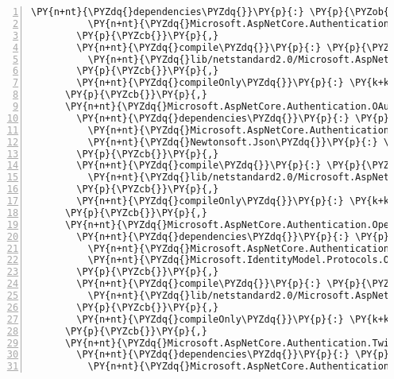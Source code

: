 \begin{Verbatim}[commandchars=\\\{\},numbers=left,firstnumber=1,stepnumber=1,numberblanklines=0]
        \PY{n+nt}{\PYZdq{}dependencies\PYZdq{}}\PY{p}{:} \PY{p}{\PYZob{}}
          \PY{n+nt}{\PYZdq{}Microsoft.AspNetCore.Authentication.OAuth\PYZdq{}}\PY{p}{:} \PY{l+s+s2}{\PYZdq{}2.1.0\PYZhy{}rc1\PYZhy{}final\PYZdq{}}
        \PY{p}{\PYZcb{}}\PY{p}{,}
        \PY{n+nt}{\PYZdq{}compile\PYZdq{}}\PY{p}{:} \PY{p}{\PYZob{}}
          \PY{n+nt}{\PYZdq{}lib/netstandard2.0/Microsoft.AspNetCore.Authentication.MicrosoftAccount.dll\PYZdq{}}\PY{p}{:} \PY{p}{\PYZob{}}\PY{p}{\PYZcb{}}
        \PY{p}{\PYZcb{}}\PY{p}{,}
        \PY{n+nt}{\PYZdq{}compileOnly\PYZdq{}}\PY{p}{:} \PY{k+kc}{true}
      \PY{p}{\PYZcb{}}\PY{p}{,}
      \PY{n+nt}{\PYZdq{}Microsoft.AspNetCore.Authentication.OAuth/2.1.0\PYZhy{}rc1\PYZhy{}final\PYZdq{}}\PY{p}{:} \PY{p}{\PYZob{}}
        \PY{n+nt}{\PYZdq{}dependencies\PYZdq{}}\PY{p}{:} \PY{p}{\PYZob{}}
          \PY{n+nt}{\PYZdq{}Microsoft.AspNetCore.Authentication\PYZdq{}}\PY{p}{:} \PY{l+s+s2}{\PYZdq{}2.1.0\PYZhy{}rc1\PYZhy{}final\PYZdq{}}\PY{p}{,}
          \PY{n+nt}{\PYZdq{}Newtonsoft.Json\PYZdq{}}\PY{p}{:} \PY{l+s+s2}{\PYZdq{}11.0.2\PYZdq{}}
        \PY{p}{\PYZcb{}}\PY{p}{,}
        \PY{n+nt}{\PYZdq{}compile\PYZdq{}}\PY{p}{:} \PY{p}{\PYZob{}}
          \PY{n+nt}{\PYZdq{}lib/netstandard2.0/Microsoft.AspNetCore.Authentication.OAuth.dll\PYZdq{}}\PY{p}{:} \PY{p}{\PYZob{}}\PY{p}{\PYZcb{}}
        \PY{p}{\PYZcb{}}\PY{p}{,}
        \PY{n+nt}{\PYZdq{}compileOnly\PYZdq{}}\PY{p}{:} \PY{k+kc}{true}
      \PY{p}{\PYZcb{}}\PY{p}{,}
      \PY{n+nt}{\PYZdq{}Microsoft.AspNetCore.Authentication.OpenIdConnect/2.1.0\PYZhy{}rc1\PYZhy{}final\PYZdq{}}\PY{p}{:} \PY{p}{\PYZob{}}
        \PY{n+nt}{\PYZdq{}dependencies\PYZdq{}}\PY{p}{:} \PY{p}{\PYZob{}}
          \PY{n+nt}{\PYZdq{}Microsoft.AspNetCore.Authentication.OAuth\PYZdq{}}\PY{p}{:} \PY{l+s+s2}{\PYZdq{}2.1.0\PYZhy{}rc1\PYZhy{}final\PYZdq{}}\PY{p}{,}
          \PY{n+nt}{\PYZdq{}Microsoft.IdentityModel.Protocols.OpenIdConnect\PYZdq{}}\PY{p}{:} \PY{l+s+s2}{\PYZdq{}5.2.0\PYZdq{}}
        \PY{p}{\PYZcb{}}\PY{p}{,}
        \PY{n+nt}{\PYZdq{}compile\PYZdq{}}\PY{p}{:} \PY{p}{\PYZob{}}
          \PY{n+nt}{\PYZdq{}lib/netstandard2.0/Microsoft.AspNetCore.Authentication.OpenIdConnect.dll\PYZdq{}}\PY{p}{:} \PY{p}{\PYZob{}}\PY{p}{\PYZcb{}}
        \PY{p}{\PYZcb{}}\PY{p}{,}
        \PY{n+nt}{\PYZdq{}compileOnly\PYZdq{}}\PY{p}{:} \PY{k+kc}{true}
      \PY{p}{\PYZcb{}}\PY{p}{,}
      \PY{n+nt}{\PYZdq{}Microsoft.AspNetCore.Authentication.Twitter/2.1.0\PYZhy{}rc1\PYZhy{}final\PYZdq{}}\PY{p}{:} \PY{p}{\PYZob{}}
        \PY{n+nt}{\PYZdq{}dependencies\PYZdq{}}\PY{p}{:} \PY{p}{\PYZob{}}
          \PY{n+nt}{\PYZdq{}Microsoft.AspNetCore.Authentication.OAuth\PYZdq{}}\PY{p}{:} \PY{l+s+s2}{\PYZdq{}2.1.0\PYZhy{}rc1\PYZhy{}final\PYZdq{}}

\end{Verbatim}
